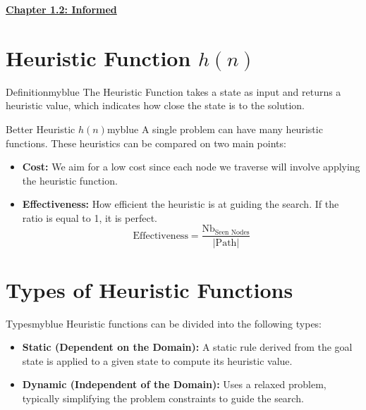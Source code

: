 
\newpage
\null
\begin{center}
    \Huge{\textbf{\underline{Chapter 1.2: Informed}}}
\end{center}

\setcounter{section}{0}

\vspace{0.35cm}

\section{Heuristic Function \(h(n)\)}
\begin{prettyBox}{Definition}{myblue}
The Heuristic Function takes a state as input and returns a heuristic value, which indicates how close the state is to the solution.
\end{prettyBox}

\vspace{0.35cm}

\begin{prettyBox}{Better Heuristic \(h(n)\)}{myblue}
A single problem can have many heuristic functions. These heuristics can be compared on two main points:
\begin{itemize}
    \item \textbf{Cost:} We aim for a low cost since each node we traverse will involve applying the heuristic function.
    \item \textbf{Effectiveness:} How efficient the heuristic is at guiding the search. If the ratio is equal to 1, it is perfect.
    \[
    \text{Effectiveness} = \frac{\text{Nb}_{\text{Seen Nodes}}}{|\text{Path}|}
    \]
\end{itemize}
\end{prettyBox}

\vspace{0.35cm}

\section{Types of Heuristic Functions}
\begin{prettyBox}{Types}{myblue}
    Heuristic functions can be divided into the following types:
    \begin{itemize}
        \item \textbf{Static (Dependent on the Domain):} A static rule derived from the goal state is applied to a given state to compute its heuristic value.
        \item \textbf{Dynamic (Independent of the Domain):} Uses a relaxed problem, typically simplifying the problem constraints to guide the search.
    \end{itemize}
\end{prettyBox}

